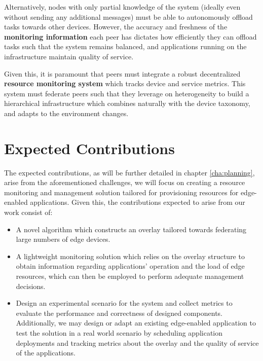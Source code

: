 Alternatively, nodes with only partial knowledge of the system (ideally even without sending any additional messages) must be able to autonomously offload tasks towards other devices. However, the accuracy and freshness of the \textbf{monitoring information} each peer has dictates how efficiently they can offload tasks such that the system remains balanced, and applications running on the infrastructure maintain quality of service. 

Given this, it is paramount that peers must integrate a robust decentralized \textbf{resource monitoring system} which tracks device and service metrics. This system must federate peers such that they leverage on heterogeneity to build a hierarchical infrastructure which combines naturally with the device taxonomy, and adapts to the environment changes. 

\section{Expected Contributions}

The expected contributions, as will be further detailed in chapter \ref{cha:planning}, arise from the aforementioned challenges, we will focus on creating a resource monitoring and management solution tailored for provisioning resources for edge-enabled applications. Given this, the contributions expected to arise from our work consist of: 

\begin{itemize}

    \item A novel algorithm which constructs an overlay tailored towards federating large numbers of edge devices.
    
    \item A lightweight monitoring solution which relies on the overlay structure to obtain information regarding applications’ operation and the load of edge resources, which can then be employed to perform adequate management decisions.
    

    \item Design an experimental scenario for the system and collect metrics to evaluate the performance and correctness of designed components. Additionally, we may design or adapt an existing edge-enabled application to test the solution in a real world scenario by scheduling application deployments and tracking metrics about the overlay and the quality of service of the applications.
    
\end{itemize}

